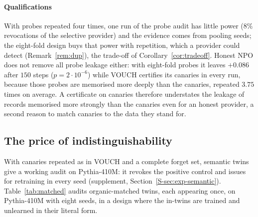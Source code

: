 \paragraph{Qualifications} With probes repeated four times, one run of the probe audit has
little power ($8\%$ revocations of the selective provider) and the evidence comes from pooling
seeds; the eight-fold design buys that power with repetition, which a provider could detect
(Remark~\ref{rem:dup}), the trade-off of Corollary~\ref{cor:tradeoff}. Honest NPO does not
remove all probe leakage either: with eight-fold probes it leaves $+0.086$ after $150$ steps
($p=2\cdot10^{-6}$) while VOUCH certifies its canaries in every run, because those probes are
memorised more deeply than the canaries, repeated $3.75$ times on average. A certificate on
canaries therefore understates the leakage of records memorised more strongly than the
canaries even for an honest provider, a second reason to match canaries to the data they stand
for.

\subsection{The price of indistinguishability}\label{sec:exp-matched}

With canaries repeated as in VOUCH and a complete forget set, semantic twins give a working
audit on Pythia-410M: it revokes the positive control and issues for retraining in every seed
(supplement, Section~\ref{S-sec:exp-semantic}). Table~\ref{tab:matched} audits organic-matched twins, each appearing once, on Pythia-410M with
eight seeds, in a design where the in-twins are trained and unlearned in their literal form.

\begin{table}[t]
\centering\footnotesize
\caption{Organic-matched twins, Pythia-410M, eight seeds: mean calibrated advantages $\pm$
standard errors, fraction of runs ($8$ seeds $\times$ $40$ reveal orders) revoked by the
literal and the union rule and issued by the union rule, and the membership-inference AUC of
the organic forget biographies against the organic holdout (loss score).}
\label{tab:matched}

\end{table}

